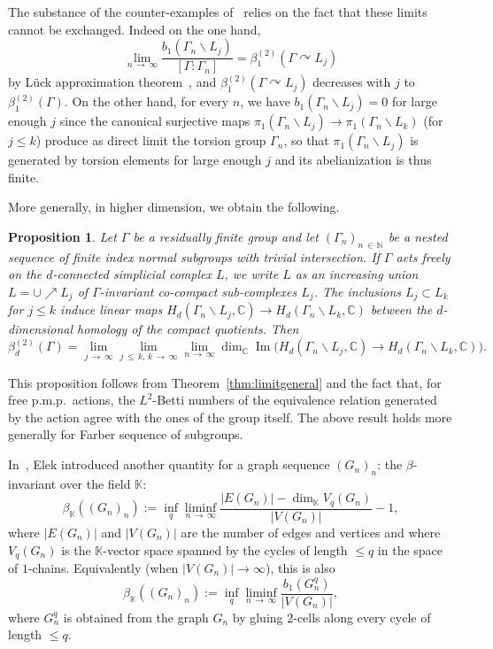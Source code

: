 \documentclass[10pt]{amsart}
\newtheorem{prop}[cdrthm]{Proposition}
\theoremstyle{definition}
\newcommand{\Nmath}{\mathbb{N}}
\newcommand{\Cmath}{\mathbb{C}}
\newcommand{\Kmath}{\mathbb{K}}
\newcommand{\acting}{\curvearrowright}
\DeclareMathOperator{\Ima}{Im}
\newcommand{\pmp}{p.m.p.\ }
\begin{document}
The substance of the counter-examples of~\cite{Lueck-Osin-2011} relies on the fact that these limits cannot be exchanged. Indeed on the one hand,
\[
\lim\limits_{n\,\to\,\infty}
\frac{b_1(\Gamma_n\backslash L_j)}{[\Gamma:\Gamma_n]}=\beta_1^{(2)}(\Gamma\acting L_j)
\]
by L\"uck approximation theorem~\cite{Luc94b}, and $\beta_1^{(2)}(\Gamma\acting L_j)$ decreases with $j$ to $\beta_1^{(2)}(\Gamma)$. On the other hand, for every $n$, we have $b_1(\Gamma_n\backslash L_j)=0$ for large enough $j$ since the canonical surjective maps $\pi_1(\Gamma_n\backslash L_j)\to \pi_1(\Gamma_n\backslash L_k)$ (for $j\leq k$) produce as direct limit the torsion group $\Gamma_n$, so that $\pi_1(\Gamma_n\backslash L_j)$ is generated by torsion elements for large enough $j$ and its abelianization is thus finite.


More generally, in higher dimension, we obtain the following.
\begin{prop}\label{prop: approx th. non cocompact}
Let $\Gamma$ be a residually finite group and let $(\Gamma_n)_{n\,\in\,\Nmath}$ be a nested sequence of finite index normal subgroups with trivial intersection. If $\Gamma$ acts freely on the $d$-connected simplicial complex $L$, we write $L$ as an increasing union $L=\cup\nearrow L_j$ of $\Gamma$-invariant co-compact sub-complexes $L_j$. The inclusions $ L_j\subset L_k$ for $j\leq k$ induce linear maps $ H_d(\Gamma_n\backslash L_j, \Cmath)\to H_d(\Gamma_n\backslash L_k, \Cmath)$ between the $d$-dimensional homology of the compact quotients. Then
\[
\beta_d^{(2)}(\Gamma)=\lim\limits_{j\,\to\,\infty}\lim\limits_{j\,\leq\,k,\, k\,\to\,\infty}\lim\limits_{n\,\to\,\infty}
\dim_{\Cmath}\Ima\bigl(H_d\left(\Gamma_n\backslash L_j, \Cmath\right)\to H_d\left(\Gamma_n\backslash L_k, \Cmath\right)\bigr).
\]
\end{prop}

This proposition follows from Theorem~\ref{thm:limitgeneral} and the fact that, for free \pmp actions, the $L^2$-Betti numbers of the equivalence relation generated by the action agree with the ones of the group itself. The above result holds more generally for Farber sequence of subgroups.



In~\cite{Elek-combinatorial-cost-2007}, Elek introduced another quantity for a graph sequence $(G_n)_n$: the $\beta$-invariant over the field $\Kmath$:
\[
\beta_\Kmath((G_n)_n):=\inf_q \liminf_{n\,\to\,\infty}\frac{\vert E(G_n)\vert - \dim_\Kmath V_q(G_n)}{\vert V(G_n)\vert} -1,
\]
where $\vert E(G_n)\vert$ and $\vert V(G_n)\vert$ are the number of edges and vertices and where $ V_q(G_n)$ is the $\Kmath$-vector space spanned by the cycles of length $\leq q$ in the space of $1$-chains. Equivalently (when $\vert V(G_n)\vert \to \infty$), this is also
\[
\beta_\Kmath((G_n)_n):=\inf_q \liminf_{n\,\to\,\infty}\frac{b_1(G_n^q)}{\vert V(G_n)\vert},
\]
where $G_n^q$ is obtained from the graph $G_n$ by gluing $2$-cells along every cycle of length $\leq q$.
\end{document}
